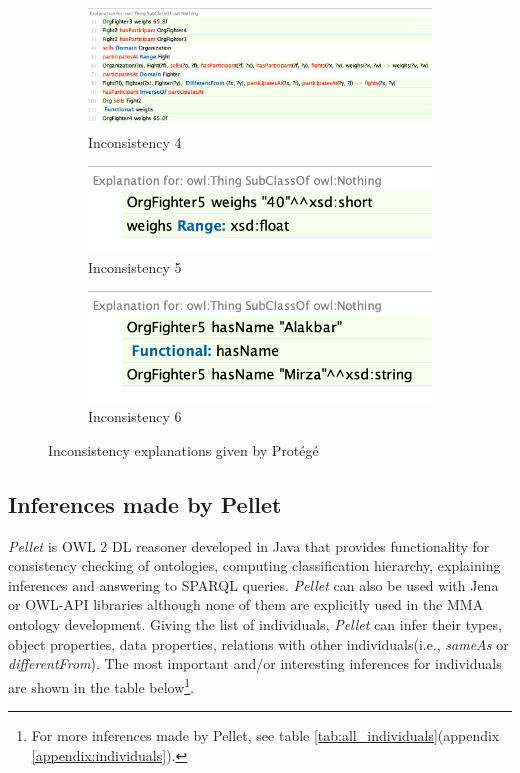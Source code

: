 \documentclass[a4paper]{article}
\begin{document}
\begin{figure}[H]
\begin{subfigure}{.3\textwidth}
	\centering
	\includegraphics[width=.9\linewidth]{resources/incons4.png}
	\caption{Inconsistency 4}
	\label{fig:sub21}
\end{subfigure}%
\begin{subfigure}{.3\textwidth}
	\centering
	\includegraphics[width=.9\linewidth]{resources/incons5.png}
	\caption{Inconsistency 5}
	\label{fig:sub22}
\end{subfigure}%
\begin{subfigure}{.3\textwidth}
	\centering
	\includegraphics[width=.9\linewidth]{resources/incons6.png}
	\caption{Inconsistency 6}
	\label{fig:sub23}
\end{subfigure}
\caption{Inconsistency explanations given by Prot\'eg\'e}
\label{fig:incons_protege}
\end{figure}

\subsection{Inferences made by Pellet}
\textit{Pellet} is OWL 2 DL reasoner developed in Java that provides functionality for consistency checking of ontologies, computing classification hierarchy, explaining inferences and answering 
to SPARQL queries. \textit{Pellet} can also be used with Jena or OWL-API libraries although none of them are explicitly used in the MMA ontology development. Giving the list of individuals, \textit{Pellet} 
can infer their types, object properties, data properties, relations with other individuals(i.e., \textit{sameAs} or \textit{differentFrom}). The most important and/or interesting inferences for 
individuals are shown in the table below\footnote{For more inferences made by Pellet, see table \ref{tab:all_individuals}(appendix \ref{appendix:individuals}).}.
\end{document}
